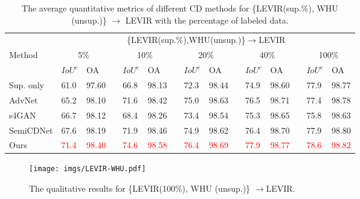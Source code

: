 \documentclass[runningheads]{llncs}
\begin{document}
\begin{table}[tb]
	\centering
	\scriptsize
	\caption{The average quantitative metrics of different CD methods for \{LEVIR(sup.\%), WHU (unsup.)\} $\rightarrow$ LEVIR with the percentage of labeled data.\vspace{-2mm}}
	\begin{tabular}{lllcllcllcllcll} \toprule
		 & \multicolumn{14}{c}{\{LEVIR(sup.\%),WHU(unsup.)\}$\rightarrow$LEVIR} \\
		\cmidrule{2-15}
		\multirow{2}{*}{\parbox[c]{.2\linewidth}{Method}} & \multicolumn{2}{c}{5\%} & & \multicolumn{2}{c}{10\%} & & \multicolumn{2}{c}{20\%} & & \multicolumn{2}{c}{40\%} & & \multicolumn{2}{c}{100\%}\\ 
		\cmidrule{2-3} \cmidrule{5-6} \cmidrule{8-9} \cmidrule{11-12} \cmidrule{14-15}
		
		& {$IoU^c$} & {OA} && {$IoU^c$} & {OA} & & {$IoU^c$} & {OA} &&{$IoU^c$} & {OA} &&{$IoU^c$} & {OA}\\
		\midrule
		Sup. only   &   61.0 & 97.60 && 66.8 & 98.13 && 72.3 & 98.44 && 74.9 & 98.60 && 77.9 & 98.77\\ AdvNet\cite{advnet}&65.2 & 98.10 && 71.6 & 98.42 && 75.0 & 98.63 && 76.5 & 98.71 && 77.4 & 98.78\\ s4GAN\cite{s4GAN}&66.7 & 98.12 && 68.4 & 98.26 && 73.4 & 98.54 && 75.3 & 98.65 && 75.8 & 98.63\\ SemiCDNet\cite{SemiCDNet} & 67.6 & 98.19 && 71.9 & 98.46 && 74.9 & 98.62 && 76.4 & 98.70 && 77.9 & 98.80\\ Ours        &   \textcolor{red}{71.4} & \textcolor{red}{98.40} && \textcolor{red}{74.6} & \textcolor{red}{98.58} && \textcolor{red}{76.4} & \textcolor{red}{98.69} && \textcolor{red}{77.9} & \textcolor{red}{98.77} &&
		                \textcolor{red}{78.6} & \textcolor{red}{98.82}\\ \bottomrule
	\end{tabular}
	
	\normalsize
	\label{tab:diferent_unl}
\end{table}
\begin{figure}[tb]
    \centering
    \texttt{[image: imgs/LEVIR-WHU.pdf]}
    \caption{The qualitative results for \{LEVIR(100\%), WHU (unsup.)\} $\rightarrow$LEVIR.\vspace{-5mm}}
    \label{fig:qual_cross_data}
\end{figure}
\vspace{-3mm}
\end{document}
